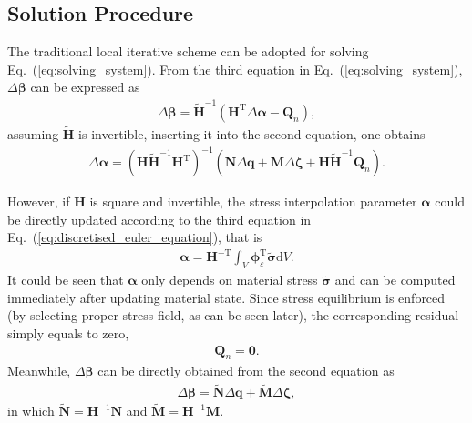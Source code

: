 \documentclass[3p,sort&compress,review,11pt]{elsarticle}
\newcommand*{\md}[1]{\mathrm{d}#1}
\newcommand*{\mT}{\mathrm{T}}
\newcommand*{\eqsref}[1]{Eq.~(\ref{#1})}
\begin{document}
\subsection{Solution Procedure}
The traditional local iterative scheme can be adopted for solving \eqsref{eq:solving_system}. From the third equation in \eqsref{eq:solving_system}, $\Delta\mathbold{\beta}$ can be expressed as
\begin{gather*}
\Delta\mathbold{\beta}=\tilde{\mathbold{H}}^{-1}\left(\mathbold{H}^\mT\Delta\mathbold{\alpha}-\mathbold{Q}_n\right),
\end{gather*}
assuming $\tilde{\mathbold{H}}$ is invertible, inserting it into the second equation, one obtains
\begin{gather*}
\Delta\mathbold{\alpha}=\left(\mathbold{H}\tilde{\mathbold{H}}^{-1}\mathbold{H}^\mT\right)^{-1}\left(\mathbold{N}\Delta\mathbold{q}+\mathbold{M}\Delta\mathbold{\zeta}+\mathbold{H}\tilde{\mathbold{H}}^{-1}\mathbold{Q}_n\right).
\end{gather*}

However, if $\mathbold{H}$ is square and invertible, the stress interpolation parameter $\mathbold{\alpha}$ could be directly updated according to the third equation in \eqsref{eq:discretised_euler_equation}, that is
\begin{gather}\label{eq:answer_alpha}
\mathbold{\alpha}=\mathbold{H}^{-\mT}\int_V\mathbold{\phi}_\varepsilon^\mT\tilde{\mathbold{\sigma}}\md{V}.
\end{gather}
It could be seen that $\mathbold{\alpha}$ only depends on material stress $\tilde{\mathbold{\sigma}}$ and can be computed immediately after updating material state. Since stress equilibrium is enforced (by selecting proper stress field, as can be seen later), the corresponding residual simply equals to zero,
\begin{gather*}
\mathbold{Q}_n=\mathbold{0}.
\end{gather*}
Meanwhile, $\Delta\mathbold{\beta}$ can be directly obtained from the second equation as
\begin{gather}\label{eq:answer_beta}
\Delta\mathbold{\beta}=\tilde{\mathbold{N}}\Delta\mathbold{q}+\tilde{\mathbold{M}}\Delta\mathbold{\zeta},
\end{gather}
in which $\tilde{\mathbold{N}}=\mathbold{H}^{-1}\mathbold{N}$ and $\tilde{\mathbold{M}}=\mathbold{H}^{-1}\mathbold{M}$.
\end{document}
